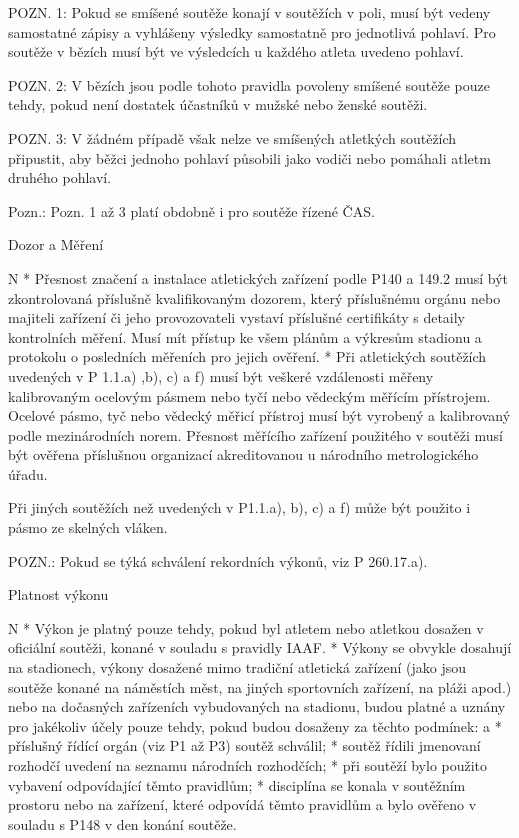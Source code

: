 POZN. 1: Pokud se smíšené soutěže konají v soutěžích v poli, musí být vedeny samostatné zápisy a vyhlášeny výsledky samostatně pro jednotlivá pohlaví. Pro soutěže v bězích musí být ve výsledcích u každého atleta uvedeno pohlaví.

POZN. 2: V bězích jsou podle tohoto pravidla povoleny smíšené soutěže pouze tehdy, pokud není dostatek účastníků v mužské nebo ženské soutěži.

POZN. 3: V žádném případě však nelze ve smíšených atletkých soutěžích připustit, aby běžci jednoho pohlaví působili jako vodiči nebo pomáhali atletm druhého pohlaví.

Pozn.: Pozn. 1 až 3 platí obdobně i pro soutěže řízené ČAS.
\enditems

\secc Dozor a Měření

\begitems \style N
* Přesnost značení a instalace atletických zařízení podle P140 a 149.2 musí být zkontrolovaná příslušně kvalifikovaným dozorem, který příslušnému orgánu nebo majiteli zařízení či jeho provozovateli vystaví příslušné certifikáty s detaily kontrolních měření. Musí mít přístup ke všem plánům a výkresům stadionu a protokolu o posledních měřeních pro jejich ověření.
* Při atletických  soutěžích uvedených v P 1.1.a) ,b), c) a f) musí být veškeré vzdálenosti měřeny kalibrovaným ocelovým pásmem nebo tyčí nebo vědeckým měřícím přístrojem. Ocelové pásmo, tyč nebo vědecký měřicí přístroj musí být vyrobený a kalibrovaný podle mezinárodních norem. Přesnost měřícího zařízení použitého v soutěži musí být ověřena příslušnou organizací akreditovanou u národního metrologického úřadu.

Při jiných soutěžích než uvedených v P1.1.a), b), c) a f) může být použito i pásmo ze skelných vláken.

POZN.: Pokud se týká schválení rekordních výkonů, viz P 260.17.a).
\enditems

\secc Platnost výkonu

\begitems \style N
* Výkon je platný pouze tehdy, pokud byl atletem nebo atletkou dosažen v oficiální soutěži, konané v souladu s pravidly IAAF.
* Výkony se obvykle dosahují na stadionech, výkony dosažené mimo tradiční atletická zařízení (jako jsou soutěže konané na náměstích měst, na jiných sportovních zařízení, na pláži apod.) nebo na dočasných zařízeních vybudovaných na stadionu, budou platné a uznány pro jakékoliv účely pouze tehdy, pokud budou dosaženy za těchto podmínek:
  \begitems \style a
  * příslušný řídící orgán (viz P1 až P3) soutěž schválil;
  * soutěž řídili jmenovaní rozhodčí uvedení na seznamu národních rozhodčích;
  * při soutěží bylo použito vybavení odpovídající těmto pravidlům;
  * disciplína se konala v soutěžním prostoru nebo na zařízení, které odpovídá těmto pravidlům a bylo ověřeno v souladu s P148 v den konání soutěže.


